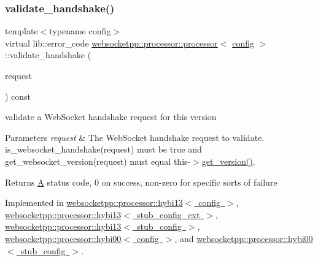 \subsubsection{\texorpdfstring{validate\+\_\+handshake()}{validate\_handshake()}}
{\footnotesize\ttfamily template$<$typename config$>$ \\
virtual lib\+::error\+\_\+code \mbox{\hyperlink{classwebsocketpp_1_1processor_1_1processor}{websocketpp\+::processor\+::processor}}$<$ \mbox{\hyperlink{classconfig}{config}} $>$\+::validate\+\_\+handshake (\begin{DoxyParamCaption}\item[{\mbox{\hyperlink{classwebsocketpp_1_1http_1_1parser_1_1request}{request\+\_\+type}} const \&}]{request }\end{DoxyParamCaption}) const\hspace{0.3cm}{\ttfamily [pure virtual]}}



validate a Web\+Socket handshake request for this version 


\begin{DoxyParams}{Parameters}
{\em request} & The Web\+Socket handshake request to validate. is\+\_\+websocket\+\_\+handshake(request) must be true and get\+\_\+websocket\+\_\+version(request) must equal this-\/$>$\mbox{\hyperlink{classwebsocketpp_1_1processor_1_1processor_a53427f90f89cf215060ceb3ce7a06c2d}{get\+\_\+version()}}.\\
\hline
\end{DoxyParams}
\begin{DoxyReturn}{Returns}
\mbox{\hyperlink{struct_a}{A}} status code, 0 on success, non-\/zero for specific sorts of failure 
\end{DoxyReturn}


Implemented in \mbox{\hyperlink{classwebsocketpp_1_1processor_1_1hybi13_af17a224a602ebcda5e481d8c249cf37c}{websocketpp\+::processor\+::hybi13$<$ config $>$}}, \mbox{\hyperlink{classwebsocketpp_1_1processor_1_1hybi13_af17a224a602ebcda5e481d8c249cf37c}{websocketpp\+::processor\+::hybi13$<$ stub\+\_\+config\+\_\+ext $>$}}, \mbox{\hyperlink{classwebsocketpp_1_1processor_1_1hybi13_af17a224a602ebcda5e481d8c249cf37c}{websocketpp\+::processor\+::hybi13$<$ stub\+\_\+config $>$}}, \mbox{\hyperlink{classwebsocketpp_1_1processor_1_1hybi00_a9458e35fabf2b39bd9e09523ad60c22c}{websocketpp\+::processor\+::hybi00$<$ config $>$}}, and \mbox{\hyperlink{classwebsocketpp_1_1processor_1_1hybi00_a9458e35fabf2b39bd9e09523ad60c22c}{websocketpp\+::processor\+::hybi00$<$ stub\+\_\+config $>$}}.

